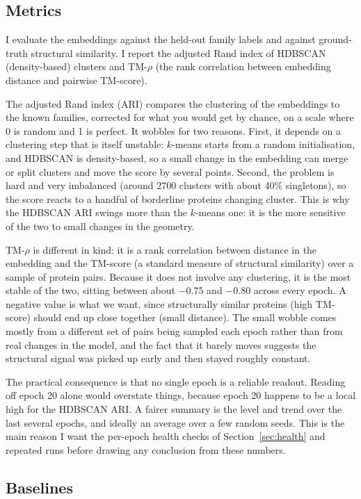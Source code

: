 \documentclass[11pt,a4paper]{article}
\theoremstyle{definition}
\begin{document}
\subsection{Metrics}

I evaluate the embeddings against the held-out family labels and against
ground-truth structural similarity. I report the adjusted Rand index of HDBSCAN
(density-based) clusters \cite{hdbscan} and TM-$\rho$ (the rank correlation
between embedding distance and pairwise TM-score).

The adjusted Rand index (ARI) compares the clustering of the embeddings to the
known families, corrected for what you would get by chance, on a scale where 0 is
random and 1 is perfect. It wobbles for two reasons. First, it depends on a
clustering step that is itself unstable: $k$-means starts from a random
initialisation, and HDBSCAN is density-based, so a small change in the embedding
can merge or split clusters and move the score by several points. Second, the
problem is hard and very imbalanced (around 2700 clusters with about 40\%
singletons), so the score reacts to a handful of borderline proteins changing
cluster. This is why the HDBSCAN ARI swings more than the $k$-means one: it is
the more sensitive of the two to small changes in the geometry.

TM-$\rho$ is different in kind: it is a rank correlation between distance in the
embedding and the TM-score (a standard measure of structural similarity) over a
sample of protein pairs. Because it does not involve any clustering, it is the
most stable of the two, sitting between about $-0.75$ and $-0.80$ across every
epoch. A negative value is what we want, since structurally similar proteins
(high TM-score) should end up close together (small distance). The small wobble
comes mostly from a different set of pairs being sampled each epoch rather than
from real changes in the model, and the fact that it barely moves suggests the
structural signal was picked up early and then stayed roughly constant.

The practical consequence is that no single epoch is a reliable readout. Reading
off epoch 20 alone would overstate things, because epoch 20 happens to be a local
high for the HDBSCAN ARI. A fairer summary is the level and trend over the last
several epochs, and ideally an average over a few random seeds. This is the main
reason I want the per-epoch health checks of Section~\ref{sec:health} and repeated runs before
drawing any conclusion from these numbers. 

\subsection{Baselines}
\end{document}
